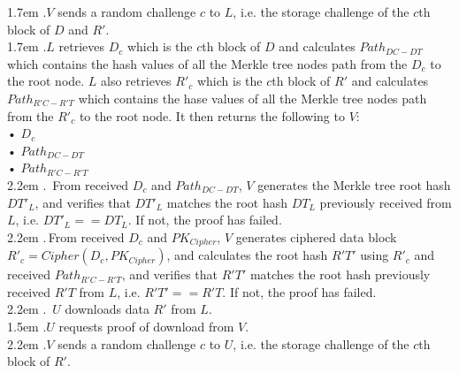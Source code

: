 \documentclass[10pt,a4paper]{article}
\begin{document}
\hangindent 1.7em
.\quad $V$ sends a random challenge $c$ to $L$, i.e. the storage challenge of the $c$th block of $D$ and $R'$.
\vspace{-0.8em}
\\

\hangindent 1.7em
.\quad $L$ retrieves $D_{c}$ which is the $c$th block of $D$ and calculates $Path_{DC-DT}$ which contains the hash values of all the Merkle tree nodes path from the $D_{c}$ to the root node. $L$ also retrieves $R'_{c}$ which is the $c$th block of $R'$ and calculates $Path_{R'C-R'T}$ which contains the hase values of all the Merkle tree nodes path from the $R'_{c}$ to the root node. It then returns the following to $V$:
\\
    •  $D_{c}$\\
   •  $Path_{DC-DT}$\\
   •  $Path_{R'C-R'T}$
   \vspace{-0.5em}
\\

\hangindent 2.2em
.\quad \, From received $D_{c}$ and $Path_{DC-DT}$, $V$ generates the Merkle tree root hash $DT'_{L}$, and verifies that $DT'_{L}$ matches the root hash $DT_{L}$ previously received from $L$, i.e. $DT'_{L} == DT_{L}$. If not, the proof has failed.
\vspace{-0.8em}
\\

\hangindent 2.2em
.\quad\;\,From received $D_{c}$ and $PK_{Cipher}$, $V$ generates ciphered data block $R'_{c}=Cipher(D_{c}, PK_{Cipher})$, and calculates the root hash $R'T'$ using $R'_{c}$ and received $Path_{R'C-R'T}$, and verifies that $R'T'$ matches the root hash previously received $R'T$ from $L$, i.e. $R'T' == R'T$. If not, the proof has failed.
\vspace{-0.8em}
\\

\hangindent 2.2em
.\quad  \,    $U$ downloads data $R'$ from $L$.
\vspace{-0.8em}
\\

\hangindent 1.5em
.\quad $U$ requests proof of download from $V$.
\vspace{-0.8em}
\\

\hangindent 2.2em
.\quad  $V$ sends a random challenge $c$ to $U$, i.e. the storage challenge of the $c$th block of $R'$.
\vspace{-0.8em}
\\
\end{document}
